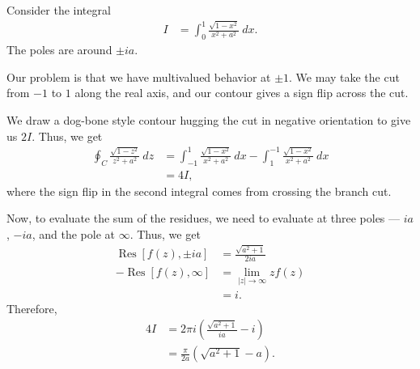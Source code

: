 \documentclass[10pt]{mypackage}
\DeclareMathOperator{\res}{Res}
\begin{document}
   \begin{example}
     Consider the integral
     \begin{align*}
       I &= \int_{0}^{1} \frac{\sqrt{1 - x^2}}{x^2 + a^2}\:dx.
     \end{align*}
     The poles are around $\pm ia$.\newline

     Our problem is that we have multivalued behavior at $\pm 1$. We may take the cut from $-1$ to $1$ along the real axis, and our contour gives a sign flip across the cut.\newline

     We draw a dog-bone style contour hugging the cut in negative orientation to give us $2I$. Thus, we get
     \begin{align*}
       \oint_{C} \frac{\sqrt{1-z^2}}{z^2 + a^2}\:dz &= \int_{-1}^{1} \frac{\sqrt{1-x^2}}{x^2 + a^2}\:dx - \int_{1}^{-1} \frac{\sqrt{1-x^2}}{x^2 + a^2}\:dx\\
                                                    &= 4I,
     \end{align*}
     where the sign flip in the second integral comes from crossing the branch cut.\newline

     Now, to evaluate the sum of the residues, we need to evaluate at three poles --- $ia$, $-ia$, and the pole at $\infty$. Thus, we get
     \begin{align*}
       \res\left[ f(z),\pm ia \right] &= \frac{\sqrt{a^2 + 1}}{2ia}\\
       -\res\left[ f(z),\infty \right] &= \lim_{|z|\rightarrow \infty}zf(z)\\
                                      &= i.
     \end{align*}
     Therefore,
     \begin{align*}
       4I &= 2\pi i \left( \frac{\sqrt{a^2 + 1}}{ia} - i \right)\\
          &= \frac{\pi}{2a}\left( \sqrt{a^2 + 1} - a \right).
     \end{align*}
   \end{example}
\end{document}
